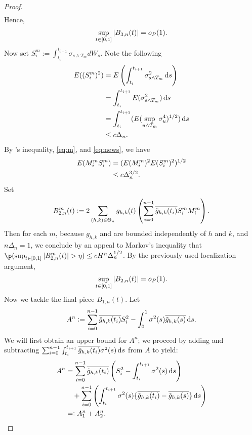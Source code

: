 \begin{proof}
\begin{align}
  \label{}
\end{align}
Hence,
\begin{align}
  \sup_{t \in [0,1]} \vert B_{3,n}(t)\vert = o_{P}( 1).
  \label{}
\end{align}
Now set $S_i^m := \int_{t_i}^{t_{i + 1}} \sigma_{s \wedge T_m} d W_s$. Note the following  
\begin{align}
  E((S_i^m)^2)   & = E\left(\int_{t_i}^{t_{i+1}} \sigma^2_{s \wedge T_m} \D s \right)\notag \\
                & = \int_{t_i}^{t_{i+1}} E(\sigma^2_{s \wedge T_m}) \D s \notag \\
                & = \int_{t_i}^{t_{i+1}} (E(\sup_{u \wedge T_m} \sigma^4_{u})^{1/2}) \D s \notag \\
  & \le c \Delta_n.\label{eq:news}
\end{align}
By \holder's inequality, \eqref{eq:m}, and \eqref{eq:news},  we have
\begin{align}
  E(M_i^m S_i^m) & = (E(M_i^m)^2 E( S^m_i)^2)^{1/2} \notag\\
  & \le c\Delta_n^{3/2}.\label{eq:ms}
\end{align}
Set 
\begin{align}
 B_{2,n}^m(t) := 2 \sum_{(h,k) \in \Theta_n} g_{h,k}(t)\left(\sum_{i=0}^{n-1} \overline{\tilde{g}_{h,k}(t_i)} S_i^m M_i^m \right) \notag.
  \label{}
\end{align}
Then for each $m$,  because  $g_{h,k}$ and \tghk  are bounded independently of $h$ and $k$, and $n\Delta_n = 1$, we conclude by an appeal to Markov's inequality  that  $\p( \sup_{t \in \domain} \vert B_{2,n}^m(t)\vert > \eta) \le  c H^n \Delta_n^{1/2}$. By the previously used localization argument, 
\begin{align}
  \sup_{t\in[0,1]}\vert B_{2,n}(t)\vert = o_{P}(1).
  \label{}
\end{align}
Now we tackle the final piece $B_{1,n}(t)$. Let 
\begin{align}
  A^n  := \sum_{i=0}^{n-1}\btghki S_i^2 -\int_{0}^{1} \sigma^2(s) \btghks \D s.
\end{align}
We will first obtain an upper bound for $A^n$; we proceed by adding and subtracting $\sumin\int_{t_i}^{t_{i+1}}\btghki \sigma^2(s)  \D s$  from  $A$ to yield: 
\begin{align}
  A^n & = \sumin\btghki \left(S_i^2 -\int_{t_i}^{t_{i+1}} \sigma^2(s) \D s\right)\notag \\
  &\quad +  \sumin\left(\int_{t_i}^{t_{i+1}} \sigma^2(s) \{\btghki - \btghks\} \D s\right) \notag\\
  &=:A_{1}^n + A_{2}^n \notag.

\end{align}
\end{proof}
